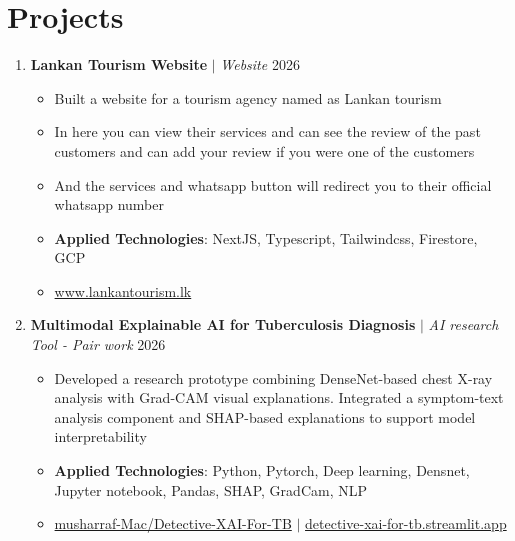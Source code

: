 \documentclass[10pt,a4paper]{article}
\newcommand{\project}[3]{%
  \textbf{#1} $|$ \textit{#2} \hfill #3}
\begin{document}
\section{Projects}

\begin{enumerate}
  \item \project{Lankan Tourism Website}{Website}{2026}
   \begin{itemize}
    \item Built a website for a tourism agency named as Lankan tourism
    \item In here you can view their services and can see the review of the past customers and can add your review if you were one of the customers
    \item And the services and whatsapp button will redirect you to their official whatsapp number
    \item \textbf{Applied Technologies}: NextJS, Typescript, Tailwindcss, Firestore, GCP
    \item \faLink \href{https://lankantourism.lk}{ www.lankantourism.lk}
   \end{itemize}

  \item \project{Multimodal Explainable AI for Tuberculosis Diagnosis}{AI research Tool - Pair work}{2026}
   \begin{itemize}
    \item Developed a research prototype combining DenseNet-based chest X-ray analysis with Grad-CAM visual explanations. Integrated a symptom-text analysis component and SHAP-based explanations to support model interpretability
    \item \textbf{Applied Technologies}: Python, Pytorch, Deep learning, Densnet, Jupyter notebook, Pandas, SHAP, GradCam, NLP
    \item \faGithub \href{https://github.com/musharraf-Mac/Detective-XAI-For-TB}{ musharraf-Mac/Detective-XAI-For-TB} \hspace{0.15cm} $|$ \hspace{0.15cm} \faLink \href{https://detective-xai-for-tb.streamlit.app}{ detective-xai-for-tb.streamlit.app}
   \end{itemize}


\end{enumerate}
\end{document}
